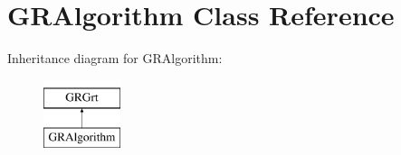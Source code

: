 \hypertarget{classGRAlgorithm}{}\section{G\+R\+Algorithm Class Reference}
\label{classGRAlgorithm}
Inheritance diagram for G\+R\+Algorithm\+:\begin{figure}[H]
\begin{center}
\leavevmode
\includegraphics[height=2.000000cm]{classGRAlgorithm}
\end{center}
\end{figure}
